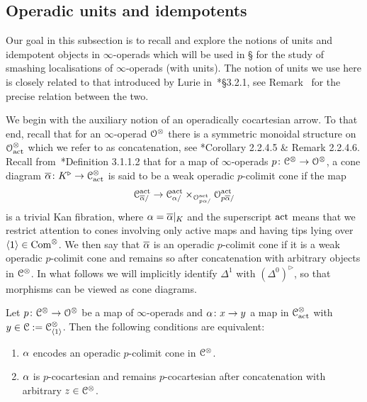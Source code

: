 \subsection{Operadic units and idempotents}
\label{subsection:units-sym-mon-objects}%




Our goal in this subsection is to recall and explore the notions of units and idempotent objects in $\infty$-operads which will be used in \S{} for the study of smashing localisations of $\infty$-operads (with units). The notion of units we use here is closely related to that introduced by Lurie in~\cite{HA}*{\S 3.2.1}, see Remark~\;
for the precise relation between the two.

We begin with the auxiliary notion of an operadically cocartesian arrow. To that end, recall that for an $\infty$-operad $\mathcal{O}^\otimes$ there is a symmetric monoidal structure on $\mathcal{O}^\otimes_{\mathrm{act}}$ which we refer to as concatenation, see \cite{HA}*{Corollary 2.2.4.5 \& Remark 2.2.4.6}.  
Recall from~\cite{HA}*{Definition 3.1.1.2} that for a map of $\infty$-operads $p\colon \mathcal C^{\otimes} \to \mathcal{O}^{\otimes}$, a cone diagram $\overline{\alpha} \colon K^{\triangleright} \to \mathcal C^{\otimes}_{\mathrm{act}}$ is said to be a weak operadic $p$-colimit cone if the map 
\[
\mathcal C^{\mathrm{act}}_{\overline{\alpha}/} \to \mathcal C^{\mathrm{act}}_{\alpha/} \times_{\mathcal{O}^{\mathrm{act}}_{p\alpha/}} \mathcal{O}^{\mathrm{act}}_{p\overline{\alpha}/}
\]
is a trivial Kan fibration, where $\alpha = \overline{\alpha}|_{K}$ and the superscript $\mathrm{act}$ means that we restrict attention to cones involving only active maps and having tips lying over $\langle1\rangle \in \mathrm{Com}^{\otimes}$. We then say that $\overline{\alpha}$ is an operadic $p$-colimit cone if it is a weak operadic $p$-colimit cone and remains so after concatenation with arbitrary objects in $\mathcal C^{\otimes}$.
In what follows we will implicitly identify $\Delta^1$ with $(\Delta^0)^\triangleright$, so that morphisms can be viewed as cone diagrams.

\begin{lemma}
\label{lemma:operadically}%
Let $p\colon \mathcal C^{\otimes} \to \mathcal{O}^{\otimes}$ be a map of $\infty$-operads and $\alpha\colon x \to y$ a map in $\mathcal C^{\otimes}_{\mathrm{act}}$ with $y \in \mathcal C := \mathcal C^{\otimes}_{\langle1\rangle}$. Then the following conditions are equivalent:
\begin{enumerate}
\item
\label{item:def1}%
$\alpha$ encodes an operadic $p$-colimit cone in $\mathcal C^{\otimes}$.
\item
\label{item:def2}%
$\alpha$ is $p$-cocartesian and remains $p$-cocartesian after concatenation with arbitrary $z \in \mathcal C^{\otimes}$.
\end{enumerate}
\end{lemma}

